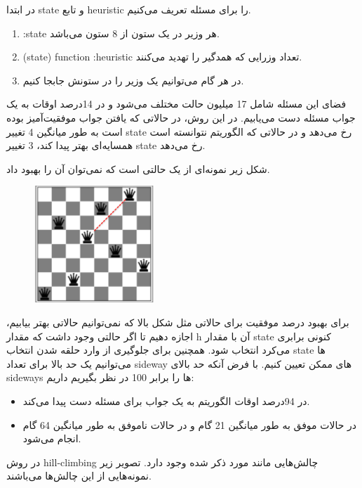 در ابتدا state و تابع heuristic را برای مسئله تعریف می‌کنیم.
\begin{enumerate}
    \item :state هر وزیر در یک ستون از 8 ستون می‌باشد.
    \item (state) function :heuristic تعداد وزرایی که همدگیر را تهدید می‌کنند.
    \item در هر گام می‌توانیم یک وزیر را در ستونش جابجا کنیم.
\end{enumerate}


فضای این مسئله شامل 17 میلیون حالت مختلف می‌شود و در 14درصد اوقات به یک جواب مسئله دست می‌یابیم.
در این روش، در حالاتی که یافتن جواب موفقیت‌آمیز بوده است به طور میانگین 4 تغییر state رخ می‌دهد و در حالاتی که الگوریتم نتوانسته است همسایه‌ای بهتر پیدا کند، 3 تغییر state رخ می‌دهد.


شکل زیر نمونه‌ای از یک حالتی است که نمی‌توان آن را بهبود داد.
\begin{figure}[H]
    \centering
    \includegraphics[width=0.4\textwidth]{source/bummer.png}
    \label{fig:bummer}
\end{figure}

برای بهبود درصد موفقیت برای حالاتی مثل شکل بالا که نمی‌توانیم حالاتی بهتر بیابیم، اجازه دهیم تا اگر حالتی وجود داشت که مقدار  h آن با مقدار state  کنونی برابری می‌کرد انتخاب شود.
همچنین برای جلوگیری از وارد حلقه شدن انتخاب state ها می‌‌توانیم یک حد بالا برای تعداد sideway های ممکن تعیین کنیم.
با فرض آنکه حد بالای sideways ها را برابر 100 در نظر بگیریم داریم:

\begin{itemize}
    \item در 94درصد اوقات الگوریتم به یک جواب برای مسئله دست پیدا می‌کند.
    \item در حالات موفق به طور میانگین 21 گام و در حالات ناموفق به طور میانگین 64 گام انجام می‌شود.
\end{itemize}

در روش hill-climbing چالش‌هایی مانند مورد ذکر شده وجود دارد.
تصویر زیر نمونه‌هایی از این چالش‌ها می‌باشند.

